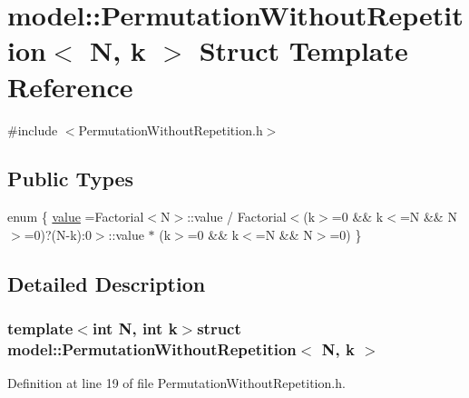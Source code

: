 \hypertarget{structmodel_1_1_permutation_without_repetition}{}\section{model\+:\+:Permutation\+Without\+Repetition$<$ N, k $>$ Struct Template Reference}
\label{structmodel_1_1_permutation_without_repetition}


{\ttfamily \#include $<$Permutation\+Without\+Repetition.\+h$>$}

\subsection*{Public Types}
\begin{DoxyCompactItemize}
\item 
enum \{ \hyperlink{structmodel_1_1_permutation_without_repetition_ab628f5a3783b9932f814465259345e9ea0aef86f534d9f1c9b286cf148ab91264}{value} =Factorial$<$N$>$\+:\+:value / Factorial$<$(k$>$=0 \&\& k$<$=N \&\& N$>$=0)?(N-\/k)\+:0$>$\+:\+:value $\ast$ (k$>$=0 \&\& k$<$=N \&\& N$>$=0)
 \}
\end{DoxyCompactItemize}


\subsection{Detailed Description}
\subsubsection*{template$<$int N, int k$>$struct model\+::\+Permutation\+Without\+Repetition$<$ N, k $>$}



Definition at line 19 of file Permutation\+Without\+Repetition.\+h.



